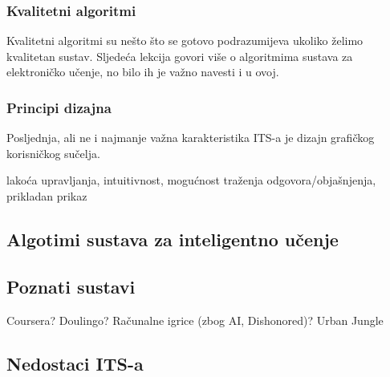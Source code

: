 \documentclass[times, utf8, zavrsni]{fer}
\begin{document}
\subsubsection{Kvalitetni algoritmi}
Kvalitetni algoritmi su nešto što se gotovo podrazumijeva ukoliko želimo kvalitetan sustav. Sljedeća lekcija govori više o algoritmima sustava za elektroničko učenje, no bilo ih je važno navesti i u ovoj.

\subsubsection{Principi dizajna}
Posljednja, ali ne i najmanje važna karakteristika ITS-a je dizajn grafičkog korisničkog sučelja.

lakoća upravljanja, intuitivnost, mogućnost traženja odgovora/objašnjenja, prikladan prikaz

\subsection{Algotimi sustava za inteligentno učenje}

\subsection{Poznati sustavi}
Coursera? Doulingo? Računalne igrice (zbog AI, Dishonored)? Urban Jungle

\subsection{Nedostaci ITS-a}
\end{document}
